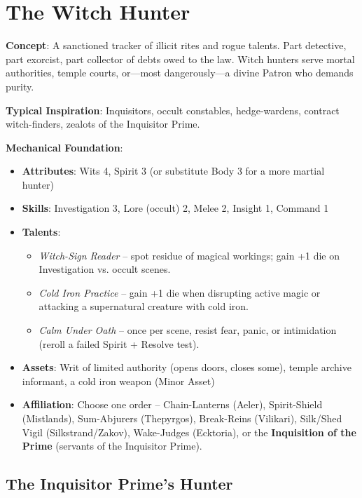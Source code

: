 \section{The Witch Hunter}

\textbf{Concept}: A sanctioned tracker of illicit rites and rogue talents. Part detective, part exorcist, part collector of debts owed to the law. Witch hunters serve mortal authorities, temple courts, or—most dangerously—a divine Patron who demands purity.

\textbf{Typical Inspiration}: Inquisitors, occult constables, hedge-wardens, contract witch-finders, zealots of the Inquisitor Prime.

\textbf{Mechanical Foundation}:
\begin{itemize}
  \item \textbf{Attributes}: Wits 4, Spirit 3 (or substitute Body 3 for a more martial hunter)
  \item \textbf{Skills}: Investigation 3, Lore (occult) 2, Melee 2, Insight 1, Command 1
  \item \textbf{Talents}: 
    \begin{itemize}
      \item \emph{Witch-Sign Reader} – spot residue of magical workings; gain +1 die on Investigation vs. occult scenes.
      \item \emph{Cold Iron Practice} – gain +1 die when disrupting active magic or attacking a supernatural creature with cold iron.
      \item \emph{Calm Under Oath} – once per scene, resist fear, panic, or intimidation (reroll a failed Spirit + Resolve test).
    \end{itemize}
  \item \textbf{Assets}: Writ of limited authority (opens doors, closes some), temple archive informant, a cold iron weapon (Minor Asset)
  \item \textbf{Affiliation}: Choose one order – Chain-Lanterns (Aeler), Spirit-Shield (Mistlands), Sum-Abjurers (Thepyrgos), Break-Reins (Vilikari), Silk/Shed Vigil (Silkstrand/Zakov), Wake-Judges (Ecktoria), or the \textbf{Inquisition of the Prime} (servants of the Inquisitor Prime).
\end{itemize}

\subsection*{The Inquisitor Prime’s Hunter}

